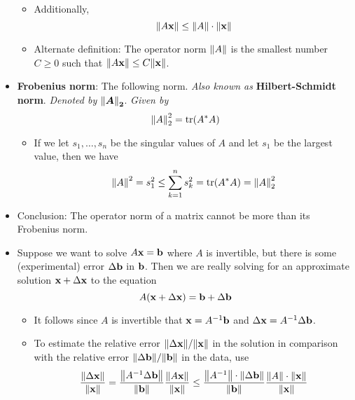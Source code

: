\documentclass[../../notes.tex]{subfiles}
\begin{document}
\begin{itemize}
\begin{itemize}
        \item Additionally,
        \begin{equation*}
            \norm{A\mathbf{x}} \leq \norm{A}\cdot\norm{\mathbf{x}}
        \end{equation*}
        \item Alternate definition: The operator norm $\norm{A}$ is the smallest number $C\geq 0$ such that $\norm{A\mathbf{x}}\leq C\norm{\mathbf{x}}$.
    \end{itemize}
    \item \textbf{Frobenius norm}: The following norm. \emph{Also known as} \textbf{Hilbert-Schmidt norm}. \emph{Denoted by} $\norm{\bm{A}}_{\bm{2}}$. \emph{Given by}
    \begin{equation*}
        \norm{A}_2^2 = \trace(A^*A)
    \end{equation*}
    \begin{itemize}
        \item If we let $s_1,\dots,s_n$ be the singular values of $A$ and let $s_1$ be the largest value, then we have
        \begin{equation*}
            \norm{A}^2 = s_1^2
            \leq \sum_{k=1}^ns_k^2
            = \trace(A^*A)
            = \norm{A}_2^2
        \end{equation*}
    \end{itemize}
    \item Conclusion: The operator norm of a matrix cannot be more than its Frobenius norm.
    \item Suppose we want to solve $A\mathbf{x}=\mathbf{b}$ where $A$ is invertible, but there is some (experimental) error $\Delta\mathbf{b}$ in $\mathbf{b}$. Then we are really solving for an approximate solution $\mathbf{x}+\Delta\mathbf{x}$ to the equation
    \begin{equation*}
        A(\mathbf{x}+\Delta\mathbf{x}) = \mathbf{b}+\Delta\mathbf{b}
    \end{equation*}
    \begin{itemize}
        \item It follows since $A$ is invertible that $\mathbf{x}=A^{-1}\mathbf{b}$ and $\Delta\mathbf{x}=A^{-1}\Delta\mathbf{b}$.
        \item To estimate the relative error $\norm{\Delta\mathbf{x}}/\norm{\mathbf{x}}$ in the solution in comparison with the relative error $\norm{\Delta\mathbf{b}}/\norm{\mathbf{b}}$ in the data, use
        \begin{equation*}
            \frac{\norm{\Delta\x}}{\norm{\x}} = \frac{\norm{A^{-1}\Delta\bb}}{\norm{\bb}}\frac{\norm{A\x}}{\norm{\x}}
            \leq \frac{\norm{A^{-1}}\cdot\norm{\Delta\bb}}{\norm{\bb}}\frac{\norm{A}\cdot\norm{\x}}{\norm{\x}}

\end{equation*}
\end{itemize}
\end{itemize}
\end{document}
